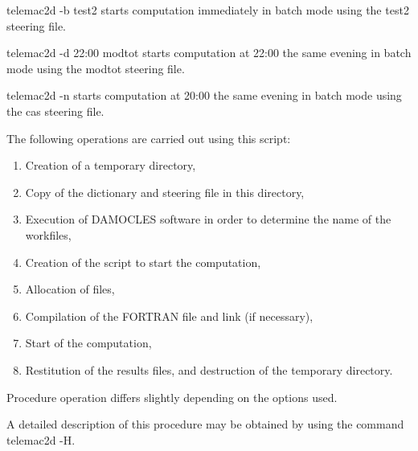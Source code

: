 telemac2d -b test2 starts computation immediately in batch mode using the test2 steering file.

 telemac2d -d 22:00 modtot starts computation at 22:00 the same evening in batch mode using the modtot steering file.

 telemac2d -n starts computation at 20:00 the same evening in batch mode using the cas steering file.



 The following operations are carried out using this script:

\begin{enumerate}
\item  Creation of a temporary directory,

\item  Copy of the dictionary and steering file in this directory,

\item  Execution of DAMOCLES software in order to determine the name of the workfiles,

\item  Creation of the script to start the computation,

\item  Allocation of files,

\item  Compilation of the FORTRAN file and link (if necessary),

\item  Start of the computation,

\item  Restitution of the results files, and destruction of the temporary directory.
\end{enumerate}



 Procedure operation differs slightly depending on the options used.

 A detailed description of this procedure may be obtained by using the command telemac2d -H.




 
